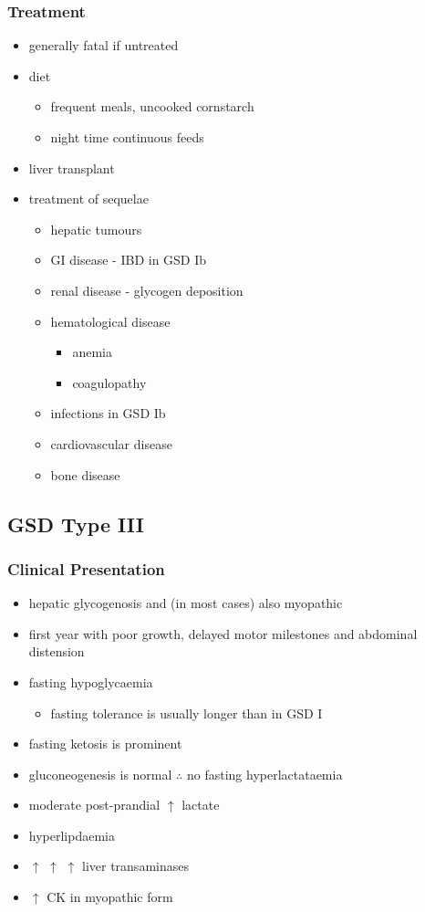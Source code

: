\documentclass[12pt]{scrartcl}
\begin{document}
\subsubsection{Treatment}
\label{sec:org8f50b60}
\begin{itemize}
\item generally fatal if untreated
\item diet
\begin{itemize}
\item frequent meals, uncooked cornstarch
\item night time continuous feeds
\end{itemize}
\item liver transplant
\item treatment of sequelae
\begin{itemize}
\item hepatic tumours
\item GI disease - IBD in GSD Ib
\item renal disease - glycogen deposition
\item hematological disease
\begin{itemize}
\item anemia
\item coagulopathy
\end{itemize}
\item infections in GSD Ib
\item cardiovascular disease
\item bone disease
\end{itemize}
\end{itemize}

\subsection{GSD Type III}
\label{sec:orga2a0908}
\subsubsection{Clinical Presentation}
\label{sec:orgdcc9f29}
\begin{itemize}
\item hepatic glycogenosis and (in most cases) also myopathic
\item first year with poor growth, delayed motor milestones and abdominal
distension
\item fasting hypoglycaemia 
\begin{itemize}
\item fasting tolerance is usually longer than in GSD I
\end{itemize}
\item fasting ketosis is prominent
\item gluconeogenesis is normal \(\therefore\) no fasting hyperlactataemia
\item moderate post-prandial \(\uparrow\) lactate
\item hyperlipdaemia
\item \(\uparrow\) \(\uparrow\) \(\uparrow\) liver transaminases
\item \(\uparrow\) CK in myopathic form
\end{itemize}
\end{document}
